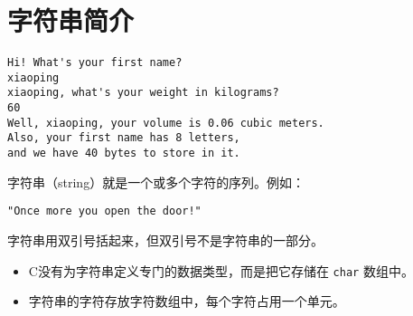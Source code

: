 \section{字符串简介}

\begin{frame} \ft{\secname}

\end{frame}


\begin{frame}[fragile] \ft{\secname}
\begin{lstlisting}
Hi! What's your first name?
xiaoping
xiaoping, what's your weight in kilograms?
60
Well, xiaoping, your volume is 0.06 cubic meters.
Also, your first name has 8 letters,
and we have 40 bytes to store in it.
\end{lstlisting}
\end{frame}

\begin{frame}[fragile] \ft{\secname}
\begin{defn}[]{}
字符串（string）就是一个或多个字符的序列。例如：
\begin{lstlisting}
"Once more you open the door!"
\end{lstlisting}

\end{defn}
\vspace{0.1in}

\begin{free}[注意]{}
字符串用双引号括起来，但双引号不是字符串的一部分。
\end{free}
\end{frame}

\begin{frame} \ft{\secname}

  \begin{free}[C 字符串]{}
    \begin{itemize}
    \item
      C没有为字符串定义专门的数据类型，而是把它存储在 \lstinline|char| 数组中。
      \\[0.1in]
    \item
      字符串的字符存放字符数组中，每个字符占用一个单元。
    \end{itemize}
  \end{free}
  
\end{frame}

